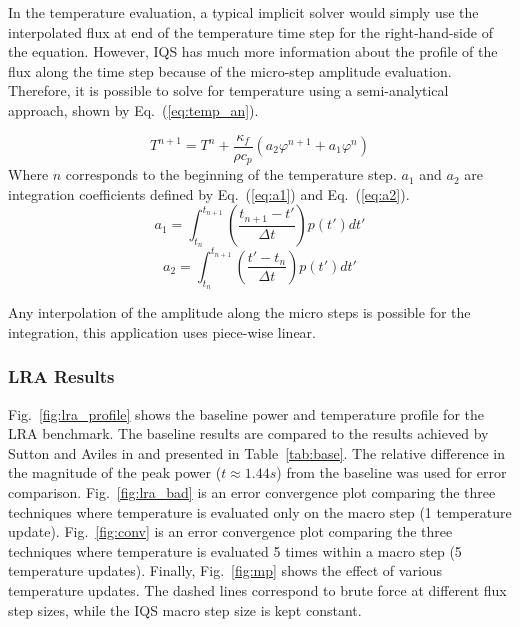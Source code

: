 \documentclass{anstrans}
\newcommand{\eqt}[1]{Eq.~(\ref{#1})}                     %
\newcommand{\fig}[1]{Fig.~\ref{#1}}                      %
\newcommand{\tbl}[1]{Table~\ref{#1}}                     %
\newcommand{\be}{\begin{equation}}
\newcommand{\ee}{\end{equation}}
\begin{document}
In the temperature evaluation, a typical implicit solver would simply use the interpolated flux at end of the temperature time step for the right-hand-side of the equation.  However, IQS has much more information about the profile of the flux along the time step because of the micro-step amplitude evaluation.  Therefore, it is possible to solve for temperature using a semi-analytical approach, shown by \eqt{eq:temp_an}.

\be
T^{n+1} = T^n + \frac{\kappa_f}{\rho c_p} \left(a_2 \varphi^{n+1} + a_1 \varphi^{n}\right)
\label{eq:temp_an}
\ee
Where $n$ corresponds to the beginning of the temperature step.  $a_1$ and $a_2$ are integration coefficients defined by \eqt{eq:a1} and \eqt{eq:a2}.
\be
a_1 = \int_{t_n}^{t_{n+1}}\left(\frac{t_{n+1}-t'}{\Delta t}\right)p(t')dt'
\label{eq:a1}
\ee
\be
a_2 = \int_{t_n}^{t_{n+1}}\left(\frac{t'-t_n}{\Delta t}\right)p(t')dt'
\label{eq:a2}
\ee

Any interpolation of the amplitude along the micro steps is possible for the integration, this application uses piece-wise linear.

\subsubsection{LRA Results}

\fig{fig:lra_profile} shows the baseline power and temperature profile for the LRA benchmark.  The baseline results are compared to the results achieved by Sutton and Aviles in \cite{Sutton_1996} and presented in \tbl{tab:base}.  The relative difference in the magnitude of the peak power ($t\approx1.44 s$) from the baseline was used for error comparison.  \fig{fig:lra_bad} is an error convergence plot comparing the three techniques where temperature is evaluated only on the macro step (1 temperature update).  \fig{fig:conv} is an error convergence plot comparing the three techniques where temperature is evaluated 5 times within a macro step (5 temperature updates).  Finally, \fig{fig:mp} shows the effect of various temperature updates. The dashed lines correspond to brute force at different flux step sizes, while the IQS macro step size is kept constant. \\
\end{document}
